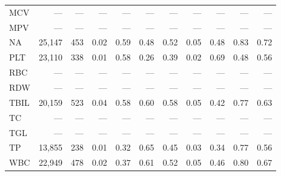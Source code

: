 \begin{table}[ht]
\begin{tabular}{lrrrrrrrrrr}
MCV & --- & --- & --- & --- & --- & --- & --- & --- & --- & --- \\
MPV & --- & --- & --- & --- & --- & --- & --- & --- & --- & --- \\
NA & 25,147 & 453 & 0.02 & 0.59 & 0.48 & 0.52 & 0.05 & 0.48 & 0.83 & 0.72 \\
PLT & 23,110 & 338 & 0.01 & 0.58 & 0.26 & 0.39 & 0.02 & 0.69 & 0.48 & 0.56 \\
RBC & --- & --- & --- & --- & --- & --- & --- & --- & --- & --- \\
RDW & --- & --- & --- & --- & --- & --- & --- & --- & --- & --- \\
TBIL & 20,159 & 523 & 0.04 & 0.58 & 0.60 & 0.58 & 0.05 & 0.42 & 0.77 & 0.63 \\
TC & --- & --- & --- & --- & --- & --- & --- & --- & --- & --- \\
TGL & --- & --- & --- & --- & --- & --- & --- & --- & --- & --- \\
TP & 13,855 & 238 & 0.01 & 0.32 & 0.65 & 0.45 & 0.03 & 0.34 & 0.77 & 0.56 \\
WBC & 22,949 & 478 & 0.02 & 0.37 & 0.61 & 0.52 & 0.05 & 0.46 & 0.80 & 0.67 \\
\bottomrule
\end{tabular}
\label{tab:12_eval_detail_inspire_mortality}
\end{table}